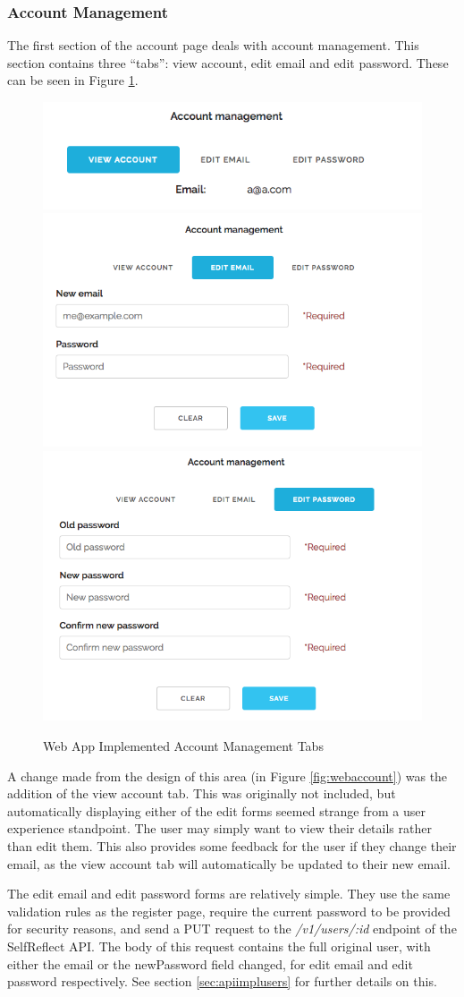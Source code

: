 \documentclass[11pt,openright,a4paper]{report}
\begin{document}
\subsubsection{Account Management}
The first section of the account page deals with account management. This section contains three \enquote{tabs}: view account, edit email and edit password. These can be seen in Figure \ref{fig:webaccounttabs}.
\begin{figure}[ht]
\centering
\caption{Web App Implemented Account Management Tabs}
\includegraphics[width=.48\textwidth]{i/webaccountviewtab.png} \\
\includegraphics[width=.48\textwidth]{i/webaccountemailtab.png} \hfill
\includegraphics[width=.48\textwidth]{i/webaccountpasswordtab.png}
\label{fig:webaccounttabs}
\end{figure}

A change made from the design of this area (in Figure \ref{fig:webaccount}) was the addition of the view account tab. This was originally not included, but automatically displaying either of the edit forms seemed strange from a user experience standpoint. The user may simply want to view their details rather than edit them. This also provides some feedback for the user if they change their email, as the view account tab will automatically be updated to their new email.

The edit email and edit password forms are relatively simple. They use the same validation rules as the register page, require the current password to be provided for security reasons, and send a PUT request to the \emph{/v1/users/:id} endpoint of the SelfReflect API. The body of this request contains the full original user, with either the email or the newPassword field changed, for edit email and edit password respectively. See section \ref{sec:apiimplusers} for further details on this.
\end{document}
